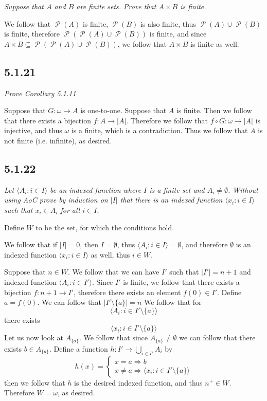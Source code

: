 \documentclass[11pt,oneside,titlepage]{book}
\DeclareMathOperator \pow {\mathcal {P}}
\DeclareMathOperator \ra {\Rightarrow}
\newcommand{\eangle}[1]{\langle #1 \rangle}
\begin{document}
\textit{Suppose that $A$ and $B$ are finite sets. Prove that $A \times B$ is finite.}

We follow that $\pow(A)$ is finite, $\pow(B)$ is also finite, thus $\pow(A) \cup \pow(B)$
is finite, therefore $\pow(\pow(A) \cup \pow(B))$ is finite, and since
$A \times B \subseteq \pow(\pow(A) \cup \pow(B))$, we follow that $A \times B$ is finite
as well.

\subsection*{5.1.21 }

\textit{Prove Corollary 5.1.11}

Suppose that $G: \omega \to A$ is one-to-one. Suppose that $A$ is finite. Then we follow that
there exists a bijection $f: A \to |A|$. Therefore we follow that
$f \circ G: \omega \to |A|$ is injective, and thus $\omega$ is a finite, which is a contradiction.
Thus we follow that $A$ is not finite (i.e. infinite), as desired.

\subsection*{5.1.22}

\textit{Let $\eangle{A_i: i \in I}$ be an indexed function where $I$ is a finite set and
  $A_i \neq \emptyset$. Without using AoC prove by induction on $|I|$ that there is
  an indexed function $\eangle{x_i: i \in I}$ such that $x_i \in A_i$ for all $i \in I$.}

Define $W$ to be the set, for which the conditions hold.

We follow that if $|I| = 0$, then $I = \emptyset$, thus $\eangle{A_i: i \in I} = \emptyset$,
and therefore $\emptyset$ is an indexed function $\eangle{x_i: i \in I}$ as well, thus
$i \in W$.

Suppose that $n \in W$. We follow that we can have  $I'$ such that
$|I'| = n + 1$ and indexed function $\eangle{A_i: i \in I'}$. Since $I'$ is finite, we follow that
there exists a bijection $f: n + 1 \to I'$, therefore there exists an element $f(0) \in I'$.
Define $a = f(0)$. We can follow that $|I' \setminus \{a\}| = n$ We follow that for
$$\eangle{A_i: i \in I' \setminus \{a\}}$$
there exists
$$\eangle{x_i: i \in I' \setminus \{a\}}$$
Let us now look at $A_{\{a\}}$. We follow that since $A_{\{a\}} \neq \emptyset$ we can follow that
there exists $b \in A_{\{a\}}$. Define a function $h: I' \to \bigcup_{i \in I'}{A_i}$ by
$$h(x) = 
\begin{cases}
  x = a \ra b \\
  x \neq a \ra \eangle{x_i: i \in I' \setminus \{a\}}
\end{cases}
$$
then we follow that $h$ is the desired indexed function, and thus $n^+ \in W$. Therefore
$W = \omega$, as desired.
\end{document}
